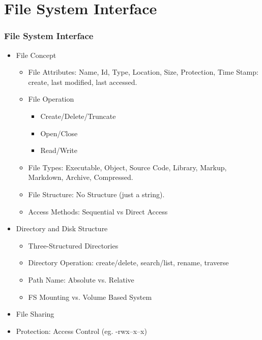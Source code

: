 \documentclass[aspectratio=169, xcolor=table, notheorems, hyperref={pdfpagelabels=false}]{beamer}
\begin{document}
\section{File System Interface}
\begin{frame}[fragile]
\frametitle{File System Interface}
\begin{itemize}
\item File Concept
\begin{itemize}
\item File Attributes: Name, Id, Type, Location, Size, Protection, Time Stamp: create, last modified, last accessed.
\item File Operation
\begin{itemize}
\item Create/Delete/Truncate
\item Open/Close
\item Read/Write
\end{itemize}
\item File Types: Executable, Object, Source Code, Library, Markup, Markdown, Archive, Compressed.
\item File Structure: No Structure (just a string).
\item Access Methods: Sequential vs Direct Access
\end{itemize}
\item Directory and Disk Structure
\begin{itemize}
\item Three-Structured Directories
\item Directory Operation: create/delete, search/list, rename, traverse
\item Path Name: Absolute vs. Relative
\item FS Mounting vs. Volume Based System
\end{itemize}
\item File Sharing
\item Protection: Access Control (eg. -rwx--x--x)
\end{itemize}
\end{frame}

\end{document}
